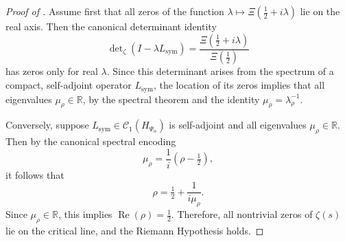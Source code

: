 \begin{proof}[Proof of ]
Assume first that all zeros of the function \( \lambda \mapsto \Xi(\tfrac{1}{2} + i\lambda) \) lie on the real axis. Then the canonical determinant identity
\[
\det\nolimits_\zeta(I - \lambda L_{\mathrm{sym}}) = \frac{\Xi(\tfrac{1}{2} + i\lambda)}{\Xi(\tfrac{1}{2})}
\]
has zeros only for real \( \lambda \). Since this determinant arises from the spectrum of a compact, self-adjoint operator \( L_{\mathrm{sym}} \), the location of its zeros implies that all eigenvalues \( \mu_\rho \in \mathbb{R} \), by the spectral theorem and the identity \( \mu_\rho = \lambda_\rho^{-1} \).

\medskip
\noindent
Conversely, suppose \( L_{\mathrm{sym}} \in \mathcal{C}_1(H_{\Psi_\alpha}) \) is self-adjoint and all eigenvalues \( \mu_\rho \in \mathbb{R} \). Then by the canonical spectral encoding
\[
\mu_\rho = \frac{1}{i}(\rho - \tfrac{1}{2}),
\]
it follows that
\[
\rho = \tfrac{1}{2} + \frac{1}{i\mu_\rho}.
\]
Since \( \mu_\rho \in \mathbb{R} \), this implies \( \operatorname{Re}(\rho) = \tfrac{1}{2} \). Therefore, all nontrivial zeros of \( \zeta(s) \) lie on the critical line, and the Riemann Hypothesis holds.
\end{proof}
